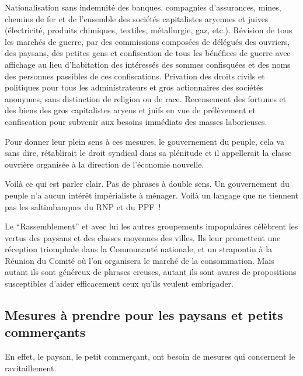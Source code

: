 \documentclass[french,twoside]{book} %
\newcommand{\bibl}[1]{{\RaggedLeft{#1}\par\bigskip}}
\newenvironment{quoteblock}%
  {\begin{quoting}}
  {\end{quoting}}
\newenvironment{quotebar}{%
    \def\FrameCommand{{\color{rubric!10!}\vrule width 0.5em} \hspace{0.9em}}%
    \def\OuterFrameSep{\itemsep} %
    \MakeFramed {\advance\hsize-\width \FrameRestore}
  }%
  {%
    \endMakeFramed
  }
\renewenvironment{quoteblock}%
  {%
    \savenotes
    \setstretch{0.9}
    \normalfont
    \begin{quotebar}
  }
  {%
    \end{quotebar}
    \spewnotes
  }
\begin{document}
\begin{quoteblock}
 \noindent Nationalisation sans indemnité des banques, compagnies d’assurances, mines, chemins de fer et de l’ensemble des sociétés capitalistes aryennes et juives (électricité, produits chimiques, textiles, métallurgie, gaz, etc.). Révision de tous les marchés de guerre, par des commissions composées de délégués des ouvriers, des paysans, des petites gens et confiscation de tous les bénéfices de guerre avec affichage au lieu d’habitation des intéressés des sommes confisquées et des noms des personnes passibles de ces confiscations. Privation des droits civils et politiques pour tous les administrateurs et gros actionnaires des sociétés anonymes, sans distinction de religion ou de race. Recensement des fortunes et des biens des gros capitalistes aryens et juifs en vue de prélèvement et confiscation pour subvenir aux besoins immédiats des masses laborieuses.\par
 
\bibl{(programme du parti communiste).}
 \end{quoteblock}

\noindent Pour donner leur plein sens à ces mesures, le gouvernement du peuple, cela va sans dire, rétablirait le droit syndical dans sa plénitude et il appellerait la classe ouvrière organisée à la direction de l’économie nouvelle.\par
Voilà ce qui est parler clair. Pas de phrases à double sens. Un gouvernement du peuple n’a aucun intérêt impérialiste à ménager. Voilà un langage que ne tiennent pas les saltimbanques du RNP et du PPF !\par
Le “Rassemblement” et avec lui les autres groupements impopulaires célèbrent les vertus des paysans et des classes moyennes des villes. Ils leur promettent une réception triomphale dans la Communauté nationale, et un strapontin à la Réunion du Comité où l’on organisera le marché de la consommation. Mais autant ils sont généreux de phrases creuses, autant ils sont avares de propositions susceptibles d’aider efficacement ceux qu’ils veulent embrigader.
\subsection[Mesures à prendre pour les paysans et petits commerçants]{Mesures à prendre pour les paysans et petits commerçants}
\noindent En effet, le paysan, le petit commerçant, ont besoin de mesures qui concernent le ravitaillement.\par
\end{document}
